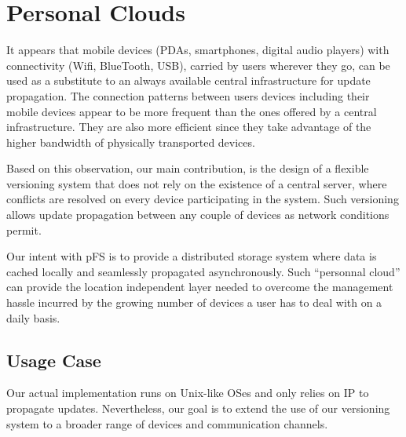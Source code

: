 


\section{Personal Clouds}
\label{sec:model}


It appears that mobile devices (PDAs, smartphones, digital audio
players) with connectivity (Wifi, BlueTooth, USB), carried by users
wherever they go, can be used as a substitute to an always available
central infrastructure for update propagation. The connection patterns
between users devices including their mobile devices appear to be more
frequent than the ones offered by a central infrastructure. They are
also more efficient since they take advantage of the higher bandwidth
of physically transported devices.

Based on this observation, our main contribution, is the design of a
flexible versioning system that does not rely on the existence of a
central server, where conflicts are resolved on every device
participating in the system. Such versioning allows update propagation
between any couple of devices as network conditions permit.

Our intent with pFS is to provide a distributed storage system where
data is cached locally and seamlessly propagated asynchronously. Such
``personnal cloud'' can provide the location independent layer needed
to overcome the management hassle incurred by the growing number of
devices a user has to deal with on a daily basis.

\subsection{Usage Case}

Our actual implementation runs on Unix-like OSes and only relies on IP
to propagate updates. Nevertheless, our goal is to extend the use of
our versioning system to a broader range of devices and communication
channels.


